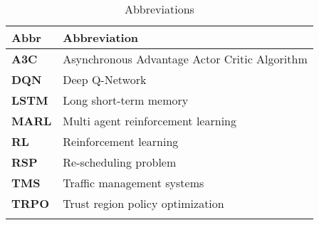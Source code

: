 \begin{longtable}{|m{3cm}|m{11cm}|}\hline	
	\rowcolor{gray} \textbf{Abbr}&
	Abbreviation \\ \hline

	\textbf{A3C}&
	Asynchronous Advantage Actor Critic Algorithm \\ \hline

	\textbf{DQN}&
	Deep Q-Network \\ \hline

	\textbf{LSTM}&
	Long short-term memory \\ \hline

	\textbf{MARL}&
	Multi agent reinforcement learning \\ \hline

	\textbf{RL}&
	Reinforcement learning \\ \hline

	\textbf{RSP}&
	Re-scheduling problem \\ \hline

	\textbf{TMS}&
	Traffic management systems \\ \hline

	\textbf{TRPO}&
	Trust region policy optimization \\ \hline

	
\caption{Abbreviations}
\label{tab:abkuerzungsverzeichnis}
\end{longtable}
